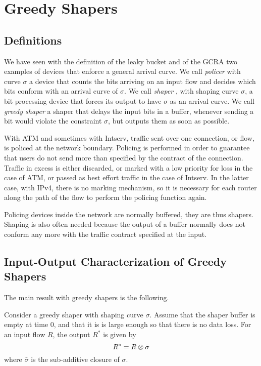 \section{Greedy Shapers}
\subsection{Definitions}

We have seen with the definition of the leaky bucket and of the
GCRA two examples of devices that enforce a general arrival curve.
We call \emph{policer}%
%
 with curve $\sigma$ a device that counts
the bits arriving on an input flow and decides which bits conform
with an arrival curve of $\sigma$. We call \emph{shaper}%
%
, with shaping curve%
%
  $\sigma$, a bit processing device that forces
its output to have $\sigma$ as an arrival curve. We call
\emph{greedy
shaper}%
 a shaper that delays the input bits in a
buffer, whenever sending a bit would violate the constraint
$\sigma$, but outputs them as soon as possible.

With ATM and sometimes with Intserv, traffic sent over one
connection, or flow, is policed at the network boundary.  Policing
is performed in order to guarantee that users do not send more
than specified by the contract of the connection.  Traffic in
excess is either discarded, or marked with a low priority for loss
in the case of ATM, or passed as best effort traffic in the case
of Intserv.  In the latter case, with IPv4, there is no marking
mechanism, so it is necessary for each router along the path of
the flow to perform the policing function again.

Policing devices inside the network are normally buffered, they
are thus shapers. Shaping is also often needed because the output
of a buffer normally does not conform any more with the traffic
contract specified at the input.
%
%
\subsection{Input-Output Characterization of Greedy Shapers}

The main result with greedy shapers is the following.

\begin{theorem}
    Consider a greedy shaper with shaping curve $\sigma$.  Assume that the
    shaper buffer is empty at time $0$, and that it is is large enough
    so that there is no data loss.  For an input flow $R$, the output
    $R^{*}$ is given by
    \begin{equation}
    R^{*}=R\mpc \bar{\sigma}
    \mylabel{eq-netcal-ndfdk8723}
\end{equation}
where $\bar{\sigma}$ is the sub-additive closure of $\sigma$.
\end{theorem}

